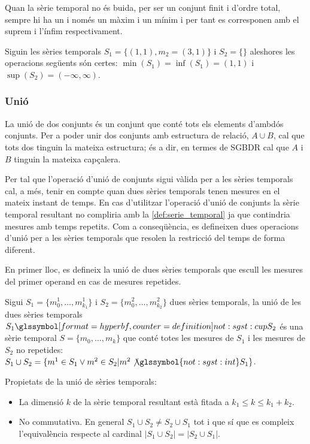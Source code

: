 Quan la sèrie temporal no és buida, per
ser un conjunt finit i d'ordre total, sempre hi ha un i només un màxim
i un mínim i per tant es corresponen amb el suprem i l'ínfim
respectivament.


\begin{example}
  Siguin les sèries temporals $S_1=\{(1,1),m_2=(3,1)\}$ i $S_2=\{\}$
  aleshores les operacions següents són certes:
  $\min(S_1)=\inf(S_1)=(1,1)$ i $\sup(S_2)=(-\infty,\infty)$.
\end{example}





\subsubsection{Unió}

La unió de dos conjunts és un conjunt que conté tots els elements
d'ambdós conjunts.  Per a poder unir dos conjunts amb estructura de
relació, $A \cup B$, cal que tots dos tinguin la mateixa estructura;
és a dir, en termes de \gls{SGBDR} cal que $A$ i $B$ tinguin la
mateixa capçalera.

Per tal que l'operació d'unió de conjunts sigui vàlida per a les
sèries temporals cal, a més, tenir en compte quan dues sèries
temporals tenen mesures en el mateix instant de temps. En cas
d'utilitzar l'operació d'unió de conjunts la sèrie temporal resultant
no compliria amb la \autoref{def:serie_temporal} ja que
contindria mesures amb temps repetits. Com a conseqüència, es
defineixen dues operacions d'unió per a les sèries temporals que
resolen la restricció del temps de forma diferent.

En primer lloc, es defineix la unió de dues sèries temporals que
escull les mesures del primer operand en cas de mesures repetides.
\begin{definition}[unió]
  Sigui $S_1=\{m_0^1, \dotsc, m_{k_1}^1\}$ i $S_2=\{m_0^2, \dotsc,
  m_{k_2}^2\}$ dues sèries temporals, la unió de les dues sèries
  temporals $S_1 \glssymboldef{not:sgst:cup} S_2$ és una sèrie
  temporal $S=\{m_0, \dotsc, m_k\}$ que conté totes les mesures de
  $S_1$ i les mesures de $S_2$ no repetides: $S_1 \cup S_2 = \{m^1 \in
  S_1 \vee m^2 \in S_2 | m^2 \not\glssymbol{not:sgst:int} S_1 \}$.
\end{definition}

Propietats de la unió de sèries temporals:
\begin{itemize}
\item La dimensió $k$ de la sèrie temporal resultant està fitada a
  $k_1 \leq k \leq k_1 + k_2$. 
\item No commutativa. En general
  $S_1\cup S_2 \neq S_2\cup S_1$ tot i que sí que es compleix
  l'equivalència respecte al cardinal $|S_1 \cup S_2| = |S_2\cup S_1|$.
\end{itemize}


